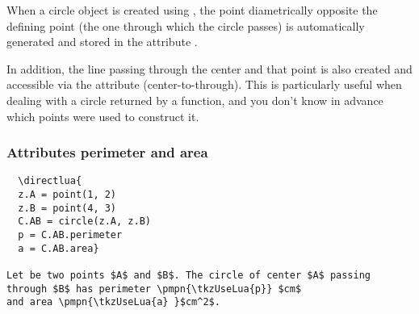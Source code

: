 \noindent
When a circle object is created using , the point diametrically opposite the defining point (the one through which the circle passes) is automatically generated and stored in the attribute .

\medskip
\noindent
In addition, the line passing through the center and that point is also created and accessible via the attribute  (center-to-through). This is particularly useful when dealing with a circle returned by a function, and you don't know in advance which points were used to construct it.

\vspace{1em}

\begin{tkzexample}[latex=7cm]
\begin{center}
\end{center}
\end{tkzexample}


\subsubsection{Attributes perimeter and area} %
\label{ssub:attributes_perimeter_and_area}

 \let\pmpn\pgfmathprintnumber
 
\begin{mybox}
\begin{verbatim}
  \directlua{
  z.A = point(1, 2)
  z.B = point(4, 3)
  C.AB = circle(z.A, z.B)
  p = C.AB.perimeter
  a = C.AB.area}
  
Let be two points $A$ and $B$. The circle of center $A$ passing 
through $B$ has perimeter \pmpn{\tkzUseLua{p}} $cm$ 
and area \pmpn{\tkzUseLua{a} }$cm^2$.
\end{verbatim}
\end{mybox}


